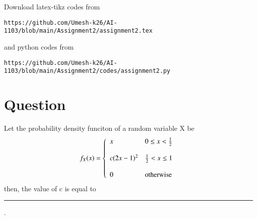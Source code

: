 \documentclass[journal,12pt,twocolumn]{IEEEtran}
\begin{document}
Download latex-tikz codes from 
%
\begin{lstlisting}
https://github.com/Umesh-k26/AI-1103/blob/main/Assignment2/assignment2.tex
\end{lstlisting}
and python codes from 
\begin{lstlisting}
https://github.com/Umesh-k26/AI-1103/blob/main/Assignment2/codes/assignment2.py
\end{lstlisting}
\section*{Question}
Let the probability density funciton of a random variable X be 
\begin{displaymath}
    f_X(x)=\left\{
                    \begin{array}{ll}
		                x &  0 \leq x < \frac{1}{2}  \\\\
		                c(2x-1)^2 & \frac{1}{2} < x \leq 1 \\\\
		                0 & \mbox{otherwise}\\
	                \end{array}    
                \right.
\end{displaymath}
\vspace{0.5cm}
then, the value of c is equal to \rule{1cm}{0.2mm}.
\end{document}

